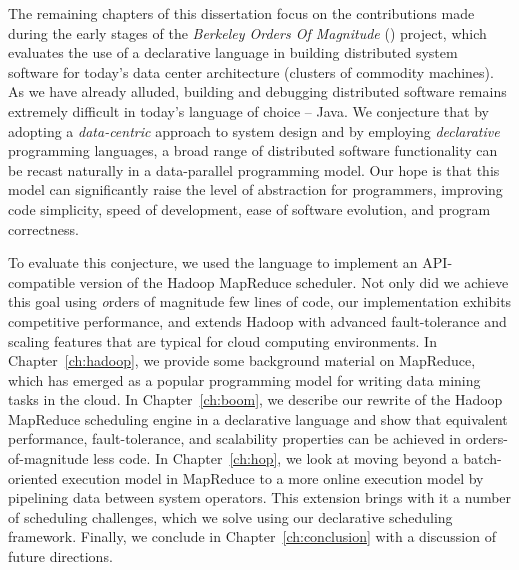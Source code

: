 The remaining chapters of this dissertation focus on the contributions made
during the early stages of the {\em Berkeley Orders Of Magnitude} (\BOOM)
project, which evaluates the use of a declarative language in building
distributed system software for today's data center architecture (clusters of
commodity machines).  As we have already alluded, building and debugging
distributed software remains extremely difficult in today's language of choice
-- Java.  We conjecture that by adopting a \emph{data-centric} approach to
system design and by employing \emph{declarative} programming languages, a
broad range of distributed software functionality can be recast naturally in a
data-parallel programming model.  Our hope is that this model can significantly
raise the level of abstraction for programmers, improving code simplicity,
speed of development, ease of software evolution, and program correctness.

To evaluate this conjecture, we used the \OVERLOG language to implement an
API-compatible version of the Hadoop MapReduce scheduler.  Not only did we
achieve this goal using {\emph orders of magnitude} few lines of code, our
implementation exhibits competitive performance, and extends Hadoop with
advanced fault-tolerance and scaling features that are typical for cloud
computing environments.  In Chapter~\ref{ch:hadoop}, we provide some background
material on MapReduce, which has emerged as a popular programming model for
writing data mining tasks in the cloud.  In Chapter~\ref{ch:boom}, we describe
our rewrite of the Hadoop MapReduce scheduling engine in a declarative language
and show that equivalent performance, fault-tolerance, and scalability
properties can be achieved in orders-of-magnitude less code.  In
Chapter~\ref{ch:hop}, we look at moving beyond a batch-oriented execution model
in MapReduce to a more online execution model by pipelining data between system
operators.  This extension brings with it a number of scheduling challenges,
which we solve using our declarative scheduling framework.  Finally, we
conclude in Chapter~\ref{ch:conclusion} with a discussion of future directions.





